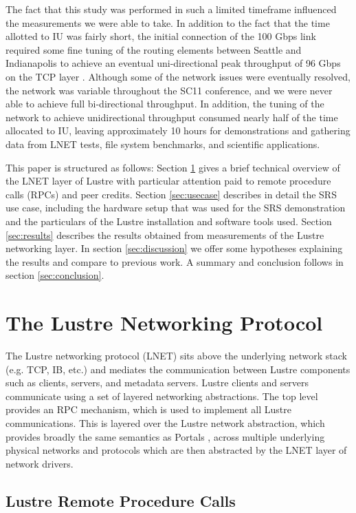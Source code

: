 \documentclass[]{sig-alternate}
\begin{document}
The fact that this study was performed in such a limited timeframe influenced the measurements we were able to
take. In addition to the fact that the time allotted to IU was fairly short, the initial connection of the 100
Gbps link required some fine tuning of the routing elements between Seattle and Indianapolis to achieve an
eventual uni-directional peak throughput of 96 Gbps on the TCP layer \cite{henschel2012}. Although some of the
network issues were eventually resolved, the network was variable throughout the SC11 conference, and we were
never able to achieve full bi-directional throughput. In addition, the tuning of the network to achieve
unidirectional throughput consumed nearly half of the time allocated to IU, leaving approximately 10 hours for
demonstrations and gathering data from LNET tests, file system benchmarks, and scientific applications.

This paper is structured as follows: Section \ref{sec:LNET} gives a brief technical overview of the LNET layer
of Lustre with particular attention paid to remote procedure calls (RPCs) and peer credits. Section
\ref{sec:usecase} describes in detail the SRS use case, including the hardware setup that was used for the SRS
demonstration and the particulars of the Lustre installation and software tools used. Section
\ref{sec:results} describes the results obtained from measurements of the Lustre networking layer. In section
\ref{sec:discussion} we offer some hypotheses explaining the results and compare to previous work. A summary and conclusion follows in section \ref{sec:conclusion}.

\section{The Lustre Networking Protocol}\label{sec:LNET}

The Lustre networking protocol (LNET) sits above the underlying network stack (e.g. TCP, IB, etc.) and
mediates the communication between Lustre components such as clients, servers, and metadata servers.  Lustre
clients and servers communicate using a set of layered networking abstractions.  The top level provides an RPC
mechanism, which is used to implement all Lustre communications.  This is layered over the Lustre network
abstraction, which provides broadly the same semantics as Portals \cite{portalspec}, across multiple
underlying physical networks and protocols which are then abstracted by the LNET layer of network drivers.

\subsection{Lustre Remote Procedure Calls}
\end{document}
